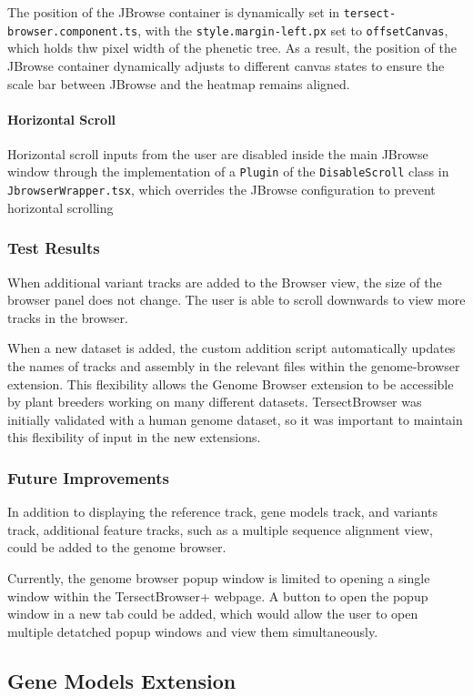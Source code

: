 \documentclass[12pt]{article}
\begin{document}
\begin{itemize}
The position of the JBrowse container is dynamically set in \verb+tersect-browser.component.ts+, with the \verb+style.margin-left.px+ set to \verb+offsetCanvas+, which holds thw pixel width of the phenetic tree. As a result, the position of the JBrowse container dynamically adjusts to different canvas states to ensure the scale bar between JBrowse and the heatmap remains aligned. 

\paragraph{Horizontal Scroll}
Horizontal scroll inputs from the user are disabled inside the main JBrowse window through the implementation of a \verb+Plugin+ of the \verb+DisableScroll+ class in \verb+JbrowserWrapper.tsx+, which overrides the JBrowse configuration to prevent horizontal scrolling


\subsubsection{Test Results}
When additional variant tracks are added to the Browser view, the size of the browser panel does not change. The user is able to scroll downwards to view more tracks in the browser. 

When a new dataset is added, the custom addition script automatically updates the names of tracks and assembly in the relevant files within the genome-browser extension. This flexibility allows the Genome Browser extension to be accessible by plant breeders working on many different datasets. TersectBrowser was initially validated with a human genome dataset, so it was important to maintain this flexibility of input in the new extensions.

\subsubsection{Future Improvements}
In addition to displaying the reference track, gene models track, and variants track, additional feature tracks, such as a multiple sequence alignment view, could be added to the genome browser.

Currently, the genome browser popup window is limited to opening a single window within the TersectBrowser+ webpage. A button to open the popup window in a new tab could be added, which would allow the user to open multiple detatched popup windows and view them simultaneously.

\subsection{Gene Models Extension}
\label{sec:Models}

\end{itemize}
\end{document}
